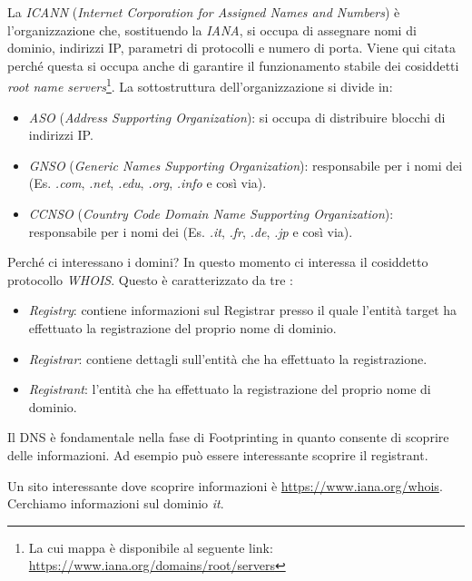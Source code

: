 \documentclass[14pt]{extreport}
\begin{document}
La \textit{ICANN} (\textit{Internet Corporation for Assigned Names and Numbers}) è l'organizzazione che, sostituendo la \textit{IANA}, si occupa di assegnare nomi di dominio, indirizzi IP, parametri di protocolli e numero di porta. Viene qui citata perché questa si occupa anche di garantire il funzionamento stabile dei cosiddetti \textit{root name servers}\footnote{La cui mappa è disponibile al seguente link: \url{https://www.iana.org/domains/root/servers}}. La sottostruttura dell'organizzazione si divide in:


\begin{itemize}
    \item \textit{ASO} (\textit{Address Supporting Organization}): si occupa di distribuire blocchi di indirizzi IP.
    
    \item \textit{GNSO} (\textit{Generic Names Supporting Organization}): responsabile per i nomi dei  (Es. \textit{.com}, \textit{.net}, \textit{.edu}, \textit{.org}, \textit{.info} e così via).
    
    \item \textit{CCNSO} (\textit{Country Code Domain Name Supporting Organization}): responsabile per i nomi dei  (Es. \textit{.it}, \textit{.fr}, \textit{.de}, \textit{.jp} e così via).
\end{itemize}

Perché ci interessano i domini? In questo momento ci interessa il cosiddetto protocollo \textit{WHOIS}. Questo è caratterizzato da tre :


\begin{itemize}
    \item \textit{Registry}: contiene informazioni sul Registrar presso il quale l'entità target ha effettuato la registrazione del proprio nome di dominio.
    
    \item \textit{Registrar}: contiene dettagli sull'entità che ha effettuato la registrazione.
    
    \item \textit{Registrant}: l'entità che ha effettuato la registrazione del proprio nome di dominio.
\end{itemize}

Il DNS è fondamentale nella fase di Footprinting in quanto consente di scoprire delle informazioni. Ad esempio può essere interessante scoprire il registrant.

Un sito interessante dove scoprire informazioni è \url{https://www.iana.org/whois}. Cerchiamo informazioni sul dominio \textit{it}.
\end{document}
